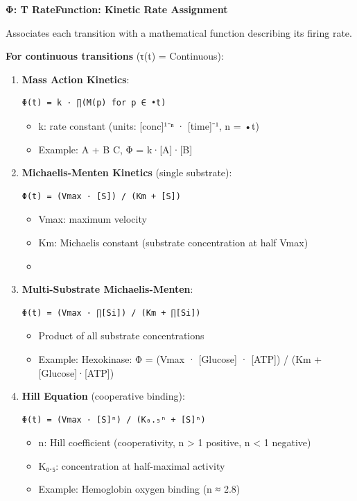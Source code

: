 \textbf{Φ: T \textrightarrow RateFunction: Kinetic Rate Assignment}

Associates each transition with a mathematical function describing its
firing rate.

\textbf{For continuous transitions} (τ(t) = Continuous):

\begin{enumerate}
\def\labelenumi{\arabic{enumi}.}
\item
  \textbf{Mass Action Kinetics}:

\begin{lstlisting}
Φ(t) = k · ∏(M(p) for p ∈ •t)
\end{lstlisting}

  \begin{itemize}
  \tightlist
  \item
    k: rate constant (units: {[}conc{]}¹⁻ⁿ · {[}time{]}⁻¹, n =
    \textbar•t\textbar)
  \item
    Example: A + B \textrightarrow C, Φ = k·{[}A{]}·{[}B{]}
  \end{itemize}
\item
  \textbf{Michaelis-Menten Kinetics} (single substrate):

\begin{lstlisting}
Φ(t) = (Vmax · [S]) / (Km + [S])
\end{lstlisting}

  \begin{itemize}
  \tightlist
  \item
    Vmax: maximum velocity
  \item
    Km: Michaelis constant (substrate concentration at half Vmax)
  \item
  \end{itemize}
\item
  \textbf{Multi-Substrate Michaelis-Menten}:

\begin{lstlisting}
Φ(t) = (Vmax · ∏[Si]) / (Km + ∏[Si])
\end{lstlisting}

  \begin{itemize}
  \tightlist
  \item
    Product of all substrate concentrations
  \item
    Example: Hexokinase: Φ = (Vmax · {[}Glucose{]} · {[}ATP{]}) / (Km +
    {[}Glucose{]}·{[}ATP{]})
  \end{itemize}
\item
  \textbf{Hill Equation} (cooperative binding):

\begin{lstlisting}
Φ(t) = (Vmax · [S]ⁿ) / (K₀.₅ⁿ + [S]ⁿ)
\end{lstlisting}

  \begin{itemize}
  \tightlist
  \item
    n: Hill coefficient (cooperativity, n \textgreater{} 1 positive, n
    \textless{} 1 negative)
  \item
    K₀.₅: concentration at half-maximal activity
  \item
    Example: Hemoglobin oxygen binding (n ≈ 2.8)
  \end{itemize}
\end{enumerate}

